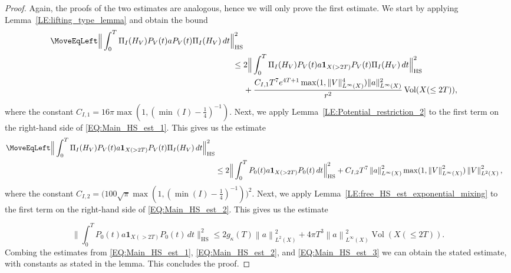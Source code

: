 \documentclass[11pt,twoside,reqno]{amsart}
\newcommand{\1}{\mathrm{\mathbf{1}}}
\newcommand{\bHS}{\mathrm{HS}}
\DeclareMathOperator{\Vol}{Vol}
\DeclareMathOperator{\vol}{Vol}
\newcommand{\norm}[1]{\left\lVert#1\right\rVert}
\numberwithin{equation}{section}
\theoremstyle{plain}
\theoremstyle{definition}
\theoremstyle{remark}
\begin{document}
\begin{proof}
Again, the proofs of the two estimates are analogous, hence we will only prove the first estimate. We start by applying Lemma~\ref{LE:lifting_type_lemma} and obtain the bound
\begin{equation}\label{EQ:Main_HS_est_1}
    \begin{aligned}
       \MoveEqLeft \Big\lVert \int_0^T \Pi_I(H_V) P_V(t) a P_V(t) \Pi_I(H_V) \, d t \Big\rVert_{\bHS}^2 
       \\
       \leq{}& 2\Big\lVert \int_0^T \Pi_I(H_V) P_V(t) a \boldsymbol{1}_{X(>2T)} P_V(t) \Pi_I(H_V) \, d t  \Big\rVert_{\bHS}^2 
        \\
        &+ \frac{C_{I,1} T^7 e^{4T+1}\max(1, \lVert V\rVert_{L^\infty(X)}^4) \lVert a \rVert^2_{L^\infty(X)}}{r^2} \Vol(X(\leq2T)), 
        \end{aligned}
    \end{equation}
    where the constant $C_{I,1} = 16\pi \max(1,(\min(I)-\frac14)^{-1})$. Next,  we apply Lemma~\ref{LE:Potential_restriction_2} to the first term on the right-hand side of \eqref{EQ:Main_HS_est_1}. This gives us the estimate
    \begin{equation}\label{EQ:Main_HS_est_2}
    \begin{aligned}
        \MoveEqLeft \Big\lVert \int_0^T \Pi_I(H_V) P_V(t) a \boldsymbol{1}_{X(>2T)} P_V(t) \Pi_I(H_V) \, d t \Big\rVert_{\bHS}^2 
       \\
       &\leq 2\Big\lVert \int_0^T P_0(t) a \boldsymbol{1}_{X(>2T)} P_0(t)   \, d t \Big\rVert_{\bHS}^2 +  C_{I,2}  T^{7} \norm{a}_{L^\infty(X)}^2 \max(1,\norm{V}_{L^\infty(X)}^2) \norm{V}_{L^2(X)}^2, 
    \end{aligned}
\end{equation}
where the constant $C_{I,2}=\big(100 \sqrt{\pi} \max(1,(\min(I)-\frac14)^{-1})\big)^2$. Next,  we apply Lemma~\ref{LE:free_HS_est_exponential_mixing} to the first term on the right-hand side of \eqref{EQ:Main_HS_est_2}. This gives us the estimate

\begin{equation}\label{EQ:Main_HS_est_3}
       \Big\lVert \int_0^T  P_0(t) a \boldsymbol{1}_{X( > 2T)} P_0(t) \,d t  \Big\rVert_{\bHS}^2 \leq 2g_\kappa(T) \norm{a}^2_{L^2(X)}+  4\pi T^3 \norm{a}_{L^\infty(X)}^2 \vol(X(\leq 2T)).
\end{equation}
Combing the estimates from \eqref{EQ:Main_HS_est_1}, \eqref{EQ:Main_HS_est_2}, and \eqref{EQ:Main_HS_est_3} we can obtain the stated estimate, with constants as stated in the lemma. This concludes the proof. 
\end{proof}
\end{document}

